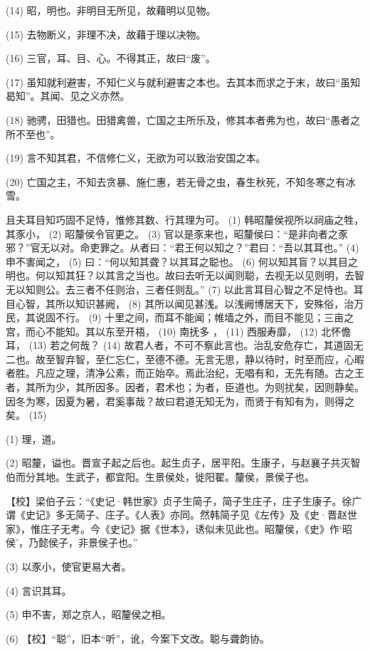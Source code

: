\documentclass[12pt,UTF8]{ctexbook}
\begin{document}
(14) 昭，明也。非明目无所见，故藉明以见物。

(15) 去物断义，非理不决，故藉于理以决物。

(16) 三官，耳、目、心。不得其正，故曰“废”。

(17) 虽知就利避害，不知仁义与就利避害之本也。去其本而求之于末，故曰“虽知曷知”。其闻、见之义亦然。

(18) 驰骋，田猎也。田猎禽兽，亡国之主所乐及，修其本者弗为也，故曰“愚者之所不至也”。

(19) 言不知其君，不信修仁义，无欲为可以致治安国之本。

(20) 亡国之主，不知去贪暴、施仁惠，若无骨之虫，春生秋死，不知冬寒之有冰雪。

且夫耳目知巧固不足恃，惟修其数、行其理为可。 (1) 韩昭釐侯视所以祠庙之牲，其豕小， (2) 昭釐侯令官更之。 (3) 官以是豕来也，昭釐侯曰：“是非向者之豕邪？”官无以对。命吏罪之。从者曰：“君王何以知之？”君曰：“吾以其耳也。” (4) 申不害闻之， (5) 曰：“何以知其聋？以其耳之聪也。 (6) 何以知其盲？以其目之明也。何以知其狂？以其言之当也。故曰去听无以闻则聪，去视无以见则明，去智无以知则公。去三者不任则治，三者任则乱。” (7) 以此言耳目心智之不足恃也。耳目心智，其所以知识甚阙， (8) 其所以闻见甚浅。以浅阙博居天下，安殊俗，治万民，其说固不行。 (9) 十里之间，而耳不能闻；帷墙之外，而目不能见；三亩之宫，而心不能知。其以东至开梧， (10) 南抚多 ， (11) 西服寿靡， (12) 北怀儋耳， (13) 若之何哉？ (14) 故君人者，不可不察此言也。治乱安危存亡，其道固无二也。故至智弃智，至仁忘仁，至德不德。无言无思，静以待时，时至而应，心暇者胜。凡应之理，清净公素，而正始卒。焉此治纪，无唱有和，无先有随。古之王者，其所为少，其所因多。因者，君术也；为者，臣道也。为则扰矣，因则静矣。因冬为寒，因夏为暑，君奚事哉？故曰君道无知无为，而贤于有知有为，则得之矣。 (15)

(1) 理，道。

(2) 昭釐，谥也。晋宣子起之后也。起生贞子，居平阳。生康子，与赵襄子共灭智伯而分其地。生武子，都宜阳。生景侯处，徙阳翟。釐侯，景侯子也。

【校】梁伯子云：“《史记·韩世家》贞子生简子，简子生庄子，庄子生康子。徐广谓《史记》多无简子、庄子。《人表》亦同。然韩简子见《左传》及《史·晋赵世家》，惟庄子无考。今《史记》据《世本》，诱似未见此也。昭釐侯，《史》作‘昭侯’，乃懿侯子，非景侯子也。”

(3) 以豕小，使官更易大者。

(4) 言识其耳。

(5) 申不害，郑之京人，昭釐侯之相。

(6) 【校】“聪”，旧本“听”，讹，今案下文改。聪与聋韵协。
\end{document}
